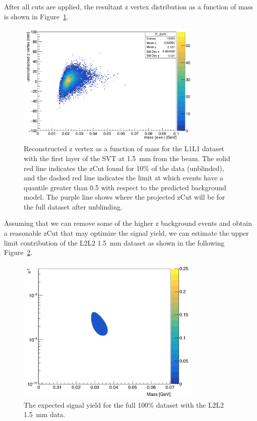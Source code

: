 \documentclass[twoside]{article}
\begin{document}
After all cuts are applied, the resultant z vertex distribution as a function of mass is shown in Figure~\ref{fig:zVm_L2L2_1p5}.

\begin{figure}[H]
  \centering
     \includegraphics[width=0.8\textwidth]{plots/zVm_L2L2_1p5.png}
  \caption{Reconstructed z vertex as a function of mass for the L1L1 dataset with the first layer of the SVT at 1.5~mm from the beam. The solid red line indicates the zCut found for 10$\%$ of the data (unblinded), and the dashed red line indicates the limit at which events have a quantile greater than 0.5 with respect to the predicted background model. The purple line shows where the projected zCut will be for the full dataset after unblinding.}
  \label{fig:zVm_L2L2_1p5}
\end{figure} 

Assuming that we can remove some of the higher z background events and obtain a reasonable zCut that may optimize the signal yield, we can estimate the upper limit contribution of the L2L2 1.5~mm dataset as shown in the following Figure~\ref{fig:reach1p5_l2l2}.

\begin{figure}[H]
  \centering
     \includegraphics[width=0.8\textwidth]{plots/reachL2L2_1p5.png}
  \caption{The expected signal yield for the full 100$\%$ dataset with the L2L2 1.5~mm data.}
  \label{fig:reach1p5_l2l2}
\end{figure} 
\end{document}

